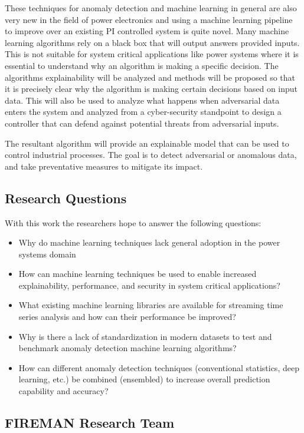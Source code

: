 These techniques for anomaly detection and machine learning in general are also very new in the field of power electronics and using a machine learning pipeline to improve over an existing PI controlled system is quite novel. Many machine learning algorithms rely on a black box that will output answers provided inputs. This is not suitable for system critical applications like power systems where it is essential to understand why an algorithm is making a specific decision. The algorithms explainability will be analyzed and methods will be proposed so that it is precisely clear why the algorithm is making certain decisions based on input data. This will also be used to analyze what happens when adversarial data enters the system and analyzed from a cyber-security standpoint to design a controller that can defend against potential threats from adversarial inputs.

The resultant algorithm will provide an explainable model that can be used to control industrial processes. The goal is to detect adversarial or anomalous data, and take preventative measures to mitigate its impact.


\subsection{Research Questions}
With this work the researchers hope to answer the following questions:
\begin{itemize}[leftmargin=1cm]
    \item Why do machine learning techniques lack general adoption in the power systems domain
    \item How can machine learning techniques be used to enable increased explainability, performance, and security in system critical applications?
    \item What existing machine learning libraries are available for streaming time series analysis and how can their performance be improved?
    \item Why is there a lack of standardization in modern datasets to test and benchmark anomaly detection machine learning algorithms?
    \item How can different anomaly detection techniques (conventional statistics, deep learning, etc.) be combined (ensembled) to increase overall prediction capability and accuracy?
\end{itemize}

\subsection{FIREMAN Research Team}

